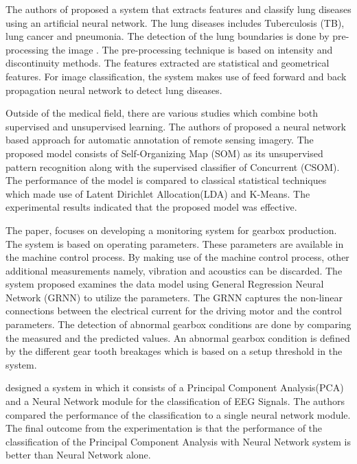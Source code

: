 \documentclass[11pt,twocolumn]{witseiepaper}
\begin{document}
	The authors of \cite{Pune2016} proposed a system that extracts features and classify lung diseases using an artificial neural network. The lung diseases includes Tuberculosis (TB), lung cancer and pneumonia. The detection of the lung boundaries is done by pre-processing the image . The pre-processing technique is based on intensity and discontinuity methods. The features extracted are statistical and geometrical features. For image classification, the system makes use of feed forward and back propagation neural network to detect lung diseases.
	
	Outside of the medical field, there are various studies which combine both supervised and unsupervised learning. The authors of \cite{neagoe_new_2014} proposed a neural network based approach for automatic annotation of remote sensing imagery. The proposed model consists of Self-Organizing Map (SOM) as its unsupervised pattern recognition along with the supervised classifier of Concurrent (CSOM). The performance of the model is compared to classical statistical techniques which made use of Latent Dirichlet Allocation(LDA) and K-Means. The experimental results indicated that the proposed model was effective.
	
	The paper, \cite{Baqqar2012} focuses on developing a monitoring system for gearbox production. The system is based on operating parameters. These parameters are available in the machine control process. By making use of the machine control process, other additional measurements namely, vibration and acoustics can be discarded. The system proposed examines the data model using General Regression Neural Network (GRNN) to utilize the parameters. The GRNN captures the non-linear connections between the electrical current for the driving motor and the control parameters. The detection of abnormal gearbox conditions are done by comparing the measured and the predicted values. An abnormal gearbox condition is defined by the different gear tooth breakages which is based on a setup threshold in the system.
	
	\cite{kottaimalai_eeg_2013} designed a system in which it consists of a Principal Component Analysis(PCA) and a Neural Network module for the classification of EEG Signals. The authors compared the performance of the classification to a single neural network module. The final outcome from the experimentation is that the performance of the classification of the Principal Component Analysis with Neural Network system is better than Neural Network alone. 
	
\end{document}
